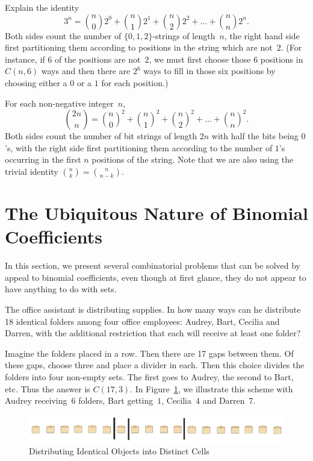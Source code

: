 \begin{example}
Explain the identity
\[3^n=\binom{n}{0}2^0+\binom{n}{1}2^1+\binom{n}{2}2^2+
\dots+\binom{n}{n}2^n.
\]
Both sides count the number of $\{0,1,2\}$-strings of length~$n$,
the right hand side first partitioning them according to positions
in the string which are not~$2$. (For instance, if $6$ of the
positions are not~$2$, we must first choose those $6$ positions in
$C(n,6)$ ways and then there are $2^6$ ways to fill in those six
positions by choosing either a $0$ or a $1$ for each position.)
\end{example}

\begin{example}
For each non-negative integer~$n$,
\[
\binom{2n}{n}=
{\binom{n}{0}}^2+{\binom{n}{1}}^2+{\binom{n}{2}}^2+\dots+
 {\binom{n}{n}}^2.
\]
Both sides count the number of bit strings of length $2n$ with half
the bits being $0$'s, with the right side first partitioning them
according to the number of $1$'s occurring in the first $n$ positions
of the string.  Note that we are also using the trivial identity
$\binom{n}{k}=\binom{n}{n-k}$.
\end{example}

\section{The Ubiquitous Nature of Binomial Coefficients}\label{s:strings:bin-coeff}

In this section, we present several combinatorial problems
that can be solved by appeal to binomial coefficients,
even though at first glance, they do not appear to have
anything to do with sets.

\begin{example} 
  The office assistant is distributing supplies.  In how many ways can
  he distribute 18 identical folders among four office employees:
  Audrey, Bart, Cecilia and Darren, with the additional restriction that
  each will receive at least one folder?

  Imagine the folders placed in a row.  Then there are 17 gaps between
  them.  Of these gaps, choose three and place a divider in each.
  Then this choice divides the folders into four non-empty sets.  The
  first goes to Audrey, the second to Bart, etc.  Thus the answer is
  $C(17,3)$.  In Figure~\ref{fig:distrib}, we illustrate this scheme
  with Audrey receiving~$6$ folders, Bart getting~$1$, Cecilia~$4$ and
  Darren~7.

\begin{figure}
\begin{center}
\includegraphics[scale=.6]{string-figs/3012-fig23}
\caption{{Distributing Identical Objects into Distinct
    Cells}}
\label{fig:distrib}
\end{center}
\end{figure}
\end{example}

